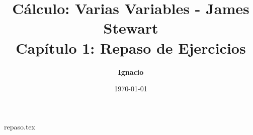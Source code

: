 \documentclass[11pt,spanish,oneside]{report}
\title{\textbf{Cálculo: Varias Variables - James Stewart} \\ \Large Capítulo 1: Repaso de Ejercicios}
\author{\textbf{Ignacio}}
\date{\today}
\begin{document}
\maketitle

{repaso.tex}
\end{document}
